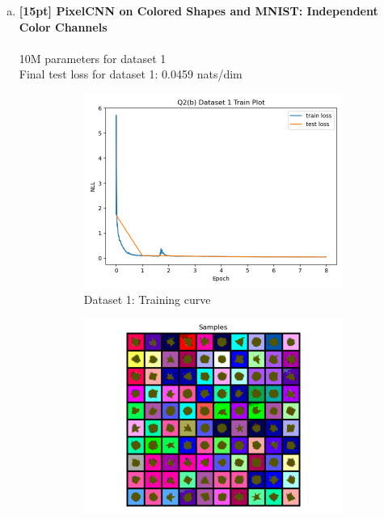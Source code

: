 \documentclass{article}
\begin{document}
\begin{enumerate}[(a)]
\item {\bf [15pt] PixelCNN on Colored Shapes and MNIST: Independent Color Channels} \\\\
10M parameters for dataset 1 \\
Final test loss for dataset 1: 0.0459 nats/dim
\begin{figure}[H]
    \centering
    \begin{subfigure}{0.45\textwidth}
        \centering
        \includegraphics[width=\textwidth]{figures/q2_b_dset1_train_plot.png}
        \caption{Dataset 1: Training curve}
    \end{subfigure}
    \hspace{0.2in}
    \begin{subfigure}{0.45\textwidth}
        \centering
        \includegraphics[width=\textwidth]{figures/q2_b_dset1_samples.png}

\end{subfigure}
\end{figure}
\end{enumerate}
\end{document}
